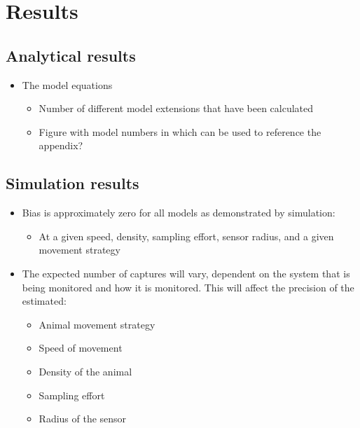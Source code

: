 \documentclass[a4paper,10pt,reqno,oneside]{amsart}
\begin{document}
\section{Results}

\subsection{Analytical results}
\begin{itemize}
\item The model equations
	\begin{itemize}
	\item Number of different model extensions that have been calculated
	\item Figure with model numbers in which can be used to reference the appendix?
	\end{itemize}
\end{itemize}


\subsection{Simulation results}
\begin{itemize}
\item Bias is approximately zero for all models as demonstrated by simulation: 
	\begin{itemize}
	\item At a given speed, density, sampling effort, sensor radius, and a given movement strategy
	\end{itemize}
\item The expected number of captures will vary, dependent on the system that is being monitored and how it is monitored. This will affect the precision of the estimated: 
	\begin{itemize}
	\item Animal movement strategy
	\item Speed of movement
	\item Density of the animal
	\item Sampling effort
	\item Radius of the sensor
	\end{itemize}
\end{itemize}
\end{document}
